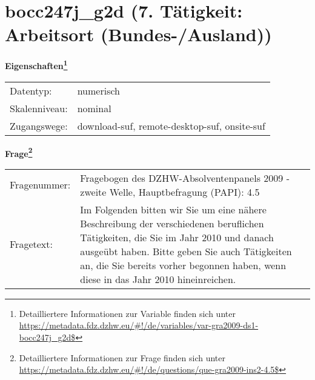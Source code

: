 
    \setcounter{footnote}{0}

    \vspace*{-1.8cm}
	\section{bocc247j\_g2d (7. Tätigkeit: Arbeitsort (Bundes-/Ausland))}
	\label{section:bocc247j_g2d}



    \vspace*{0.5cm}
    \noindent\textbf{Eigenschaften\footnote{Detailliertere Informationen zur Variable finden sich unter
		\url{https://metadata.fdz.dzhw.eu/\#!/de/variables/var-gra2009-ds1-bocc247j_g2d$}}}\\
	\begin{tabularx}{\hsize}{@{}lX}
	Datentyp: & numerisch \\
	Skalenniveau: & nominal \\
	Zugangswege: &
	  download-suf, 
	  remote-desktop-suf, 
	  onsite-suf
 \\
    \end{tabularx}



				\vspace*{0.5cm}
                \noindent\textbf{Frage\footnote{Detailliertere Informationen zur Frage finden sich unter
		              \url{https://metadata.fdz.dzhw.eu/\#!/de/questions/que-gra2009-ins2-4.5$}}}\\
				\begin{tabularx}{\hsize}{@{}lX}
					Fragenummer: &
					  Fragebogen des DZHW-Absolventenpanels 2009 - zweite Welle, Hauptbefragung (PAPI):
					  4.5
 \\
					Fragetext: & Im Folgenden bitten wir Sie um eine nähere Beschreibung der verschiedenen beruflichen Tätigkeiten, die Sie im Jahr 2010 und danach ausgeübt haben. Bitte geben Sie auch Tätigkeiten an, die Sie bereits vorher begonnen haben, wenn diese in das Jahr 2010 hineinreichen. \\
				\end{tabularx}





